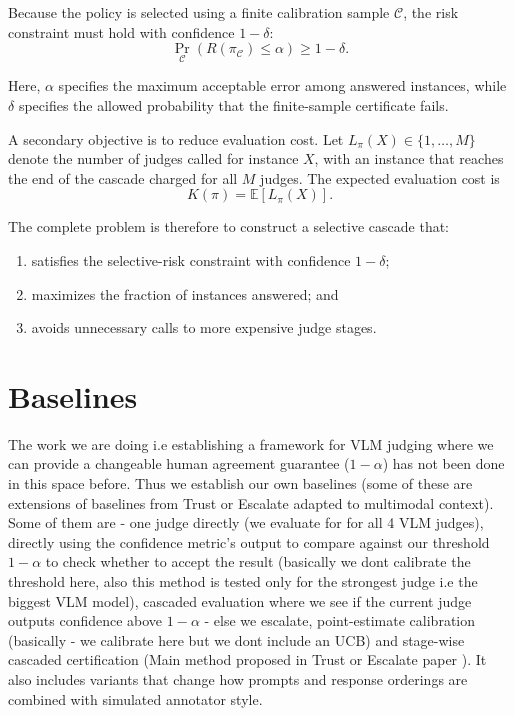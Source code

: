 \documentclass[11pt]{article}
\begin{document}
Because the policy is selected using a finite calibration sample
$\mathcal{C}$, the risk constraint must hold with confidence
$1-\delta$:
\begin{equation}
    \Pr_{\mathcal{C}}
    \left(
        R(\pi_{\mathcal{C}})\leq\alpha
    \right)
    \geq 1-\delta.
    \label{eq:problem-guarantee}
\end{equation}

Here, $\alpha$ specifies the maximum acceptable error among answered
instances, while $\delta$ specifies the allowed probability that the
finite-sample certificate fails.

A secondary objective is to reduce evaluation cost. Let
$L_{\pi}(X)\in\{1,\ldots,M\}$ denote the number of judges called for instance
$X$, with an instance that reaches the end of the cascade charged for all
$M$ judges. The expected evaluation cost is
\begin{equation}
    K(\pi)=\mathbb{E}[L_{\pi}(X)].
\end{equation}

The complete problem is therefore to construct a selective cascade that:

\begin{enumerate}
    \item satisfies the selective-risk constraint with confidence
          $1-\delta$;
    \item maximizes the fraction of instances answered; and
    \item avoids unnecessary calls to more expensive judge stages.
\end{enumerate}

\section{Baselines}

The work we are doing i.e establishing a framework for VLM judging where we can provide a changeable human agreement guarantee ($1 -\alpha$) has not been done in this space before. Thus we establish our own baselines (some of these are extensions of baselines from Trust or Escalate \cite{DBLP:conf/iclr/JungB025} adapted to multimodal context). Some of them are - one judge directly (we evaluate for for all 4 VLM judges), directly using the confidence metric's output to compare against our threshold $1 -\alpha$ to check whether to accept the result (basically we dont calibrate the threshold here, also this method is tested only for the strongest judge i.e the biggest VLM model), cascaded evaluation where we see if the current judge outputs confidence above $1 - \alpha$ - else we escalate, point-estimate calibration (basically - we calibrate here but we dont include an UCB) and stage-wise cascaded certification (Main method proposed in Trust or Escalate paper \cite{jung2024trust}). It also includes variants that change how prompts and response orderings are combined with simulated annotator style. 
\end{document}
